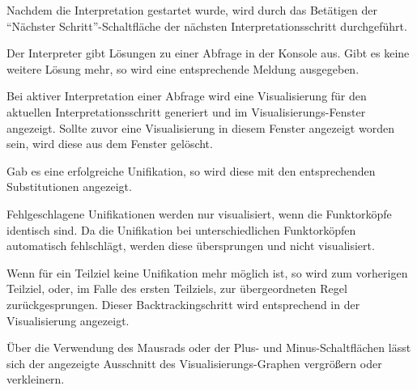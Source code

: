 \documentclass[parskip=full,11pt,twoside]{scrartcl}
\begin{document}

Nachdem die Interpretation gestartet wurde, wird durch das Betätigen der \enquote{Nächster Schritt}-Schaltfläche der nächsten Interpretationsschritt durchgeführt.


Der Interpreter gibt Lösungen zu einer Abfrage in der Konsole aus. Gibt es keine weitere Lösung mehr, so wird eine entsprechende Meldung ausgegeben.


Bei aktiver Interpretation einer Abfrage wird eine Visualisierung für den aktuellen Interpretationsschritt generiert und im Visualisierungs-Fenster angezeigt. Sollte zuvor eine Visualisierung in diesem Fenster angezeigt worden sein, wird diese aus dem Fenster gelöscht.


Gab es eine erfolgreiche Unifikation, so wird diese mit den entsprechenden Substitutionen angezeigt.


Fehlgeschlagene Unifikationen werden nur visualisiert, wenn die Funktorköpfe identisch sind. Da die Unifikation bei unterschiedlichen Funktorköpfen automatisch fehlschlägt, werden diese übersprungen und nicht visualisiert.


Wenn für ein Teilziel keine Unifikation mehr möglich ist, so wird zum vorherigen Teilziel, oder, im Falle des ersten Teilziels, zur übergeordneten Regel zurückgesprungen. Dieser Backtrackingschritt wird entsprechend in der Visualisierung angezeigt.


Über die Verwendung des Mausrads oder der Plus- und Minus-Schaltflächen lässt sich der angezeigte Ausschnitt des Visualisierungs-Graphen vergrößern oder verkleinern.
\end{document}
